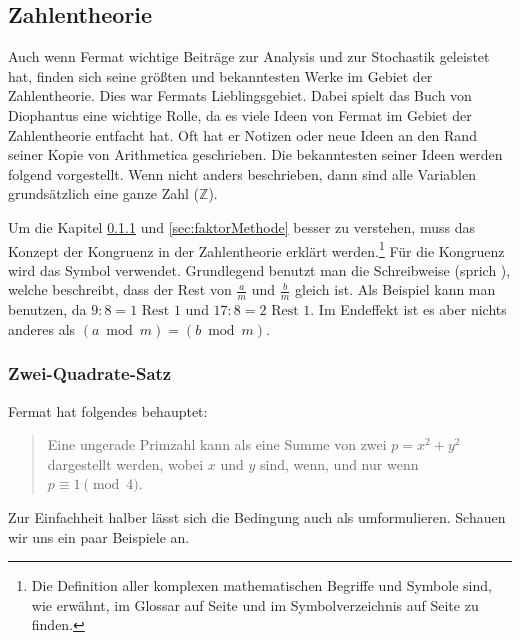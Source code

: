 \subsection{Zahlentheorie} \label{sec:zahlentheorie}
    Auch wenn Fermat wichtige Beiträge zur Analysis und zur Stochastik geleistet hat, finden sich seine größten und bekanntesten Werke im Gebiet der \Gls{Zahlentheorie}. Dies war Fermats Lieblingsgebiet. Dabei spielt das Buch \textit{} von Diophantus eine wichtige Rolle, da es viele Ideen von Fermat im Gebiet der \Gls{Zahlentheorie} entfacht hat. Oft hat er Notizen oder neue Ideen an den Rand seiner Kopie von Arithmetica geschrieben. Die bekanntesten seiner Ideen werden folgend vorgestellt. Wenn nicht anders beschrieben, dann sind alle Variablen grundsätzlich eine ganze Zahl ($\mathbb{Z}$).
    
    Um die Kapitel \ref{sec:2sqr} und \ref{sec:faktorMethode} besser zu verstehen, muss das Konzept der \Gls{Kongruenz} in der \Gls{Zahlentheorie} erklärt werden.\footnote{Die Definition aller komplexen mathematischen Begriffe und Symbole sind, wie erwähnt, im Glossar auf Seite \pageref{sec:glossary} und im Symbolverzeichnis auf Seite \pageref{sec:symb} zu finden.} Für die \Gls{Kongruenz} wird das Symbol  verwendet. Grundlegend benutzt man die Schreibweise  (sprich ), welche beschreibt, dass der Rest von $\frac{a}{m}$ und $\frac{b}{m}$ gleich ist. Als Beispiel kann man  benutzen, da $9 : 8 = 1 \text{ Rest } 1$ und $17 : 8 = 2 \text{ Rest } 1$. Im Endeffekt ist es aber nichts anderes als $(a \bmod m) = (b \bmod m)$.

    \subsubsection{Zwei-Quadrate-Satz} \label{sec:2sqr}
        Fermat hat folgendes behauptet:
        
        \begin{quote}
            Eine ungerade \Gls{Primzahl} kann als eine Summe von zwei  $p = x^2 + y^2$ dargestellt werden, wobei $x$ und $y$  sind, wenn, und nur wenn $p \equiv 1 \pmod{4}$.
        \end{quote}
        
        Zur Einfachheit halber lässt sich die Bedingung  auch als  umformulieren. Schauen wir uns ein paar Beispiele an.
        
